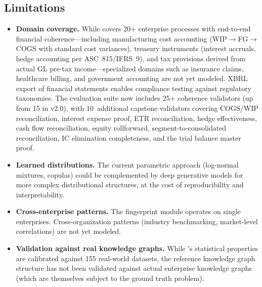 \subsection{Limitations}
\label{sec:limitations}

\begin{itemize}
  \item \textbf{Domain coverage.}  While \system{} covers 20+ enterprise
    processes with end-to-end financial coherence---including
    manufacturing cost accounting (WIP$\to$FG$\to$COGS with standard
    cost variances), treasury instruments (interest accruals, hedge
    accounting per ASC~815/IFRS~9), and tax provisions derived from
    actual GL pre-tax income---specialized domains such as insurance
    claims, healthcare billing, and government accounting are not yet
    modeled.  XBRL export of financial statements enables compliance
    testing against regulatory taxonomies.  The evaluation suite now
    includes 25+ coherence validators (up from 15 in v2.0), with
    10~additional capstone validators covering COGS/WIP reconciliation,
    interest expense proof, ETR reconciliation, hedge effectiveness,
    cash flow reconciliation, equity rollforward,
    segment-to-consolidated reconciliation, IC elimination completeness,
    and the trial balance master proof.

  \item \textbf{Learned distributions.}  The current parametric approach
    (log-normal mixtures, copulas) could be complemented by deep
    generative models for more complex distributional structures, at
    the cost of reproducibility and interpretability.

  \item \textbf{Cross-enterprise patterns.}  The fingerprint module
    operates on single enterprises.  Cross-organization patterns
    (industry benchmarking, market-level correlations) are not yet
    modeled.

  \item \textbf{Validation against real knowledge graphs.}  While
    \system{}'s statistical properties are calibrated against 155
    real-world datasets, the reference knowledge graph structure
    has not been validated against actual enterprise knowledge graphs
    (which are themselves subject to the ground truth problem).
\end{itemize}

